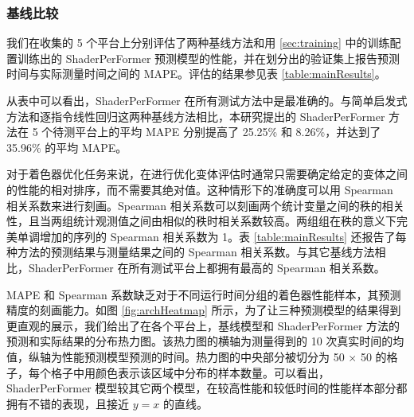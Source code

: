 \subsubsection{基线比较}

我们在收集的 5 个平台上分别评估了两种基线方法和用 \ref{sec:training} 中的训练配置训练出的 ShaderPerFormer 预测模型的性能，并在划分出的验证集上报告预测时间与实际测量时间之间的 MAPE。评估的结果参见表 \ref{table:mainResults}。

从表中可以看出，ShaderPerFormer 在所有测试方法中是最准确的。与简单启发式方法和逐指令线性回归这两种基线方法相比，本研究提出的 ShaderPerFormer 方法在 5 个待测平台上的平均 MAPE 分别提高了 25.25\% 和 8.26\%，并达到了 35.96\% 的平均 MAPE。

对于着色器优化任务来说，在进行优化变体评估时通常只需要确定给定的变体之间的性能的相对排序，而不需要其绝对值。这种情形下的准确度可以用 Spearman 相关系数来进行刻画。Spearman 相关系数可以刻画两个统计变量之间的秩的相关性，且当两组统计观测值之间由相似的秩时相关系数较高。两组组在秩的意义下完美单调增加的序列的 Spearman 相关系数为 1。表 \ref{table:mainResults} 还报告了每种方法的预测结果与测量结果之间的 Spearman 相关系数。与其它基线方法相比，ShaderPerFormer 在所有测试平台上都拥有最高的 Spearman 相关系数。

MAPE 和 Spearman 系数缺乏对于不同运行时间分组的着色器性能样本，其预测精度的刻画能力。如图 \ref{fig:archHeatmap} 所示，为了让三种预测模型的结果得到更直观的展示，我们给出了在各个平台上，基线模型和 ShaderPerFormer 方法的预测和实际结果的分布热力图。该热力图的横轴为测量得到的 10 次真实时间的均值，纵轴为性能预测模型预测的时间。热力图的中央部分被切分为 50 $\times$ 50 的格子，每个格子中用颜色表示该区域中分布的样本数量。可以看出，ShaderPerFormer 模型较其它两个模型，在较高性能和较低时间的性能样本部分都拥有不错的表现，且接近 $y=x$ 的直线。

